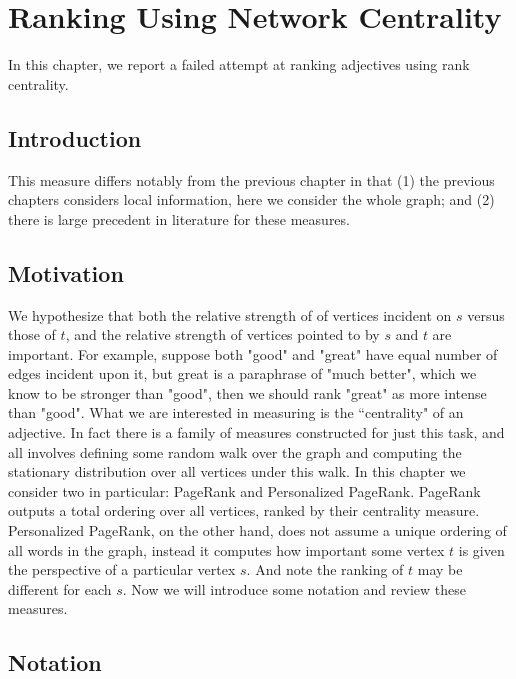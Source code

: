 \section{Ranking Using Network Centrality}

In this chapter, we report a failed attempt at ranking adjectives using rank centrality.

\subsection{Introduction}


This measure differs notably from the previous chapter in that (1) the previous chapters considers local information, here we consider the whole graph; and (2) there is large precedent in literature for these measures. 

\subsection{Motivation}

We hypothesize that both the relative strength of of vertices incident on $s$ versus those of $t$, and the relative strength of vertices pointed to by $s$ and $t$ are important. For example, suppose both "good" and "great" have equal number of edges incident upon it, but great is a paraphrase of "much better", which we know to be stronger than "good", then we should rank "great" as more intense than "good". What we are interested in measuring is the ``centrality" of an adjective. In fact there is a family of measures constructed for just this task, and all involves defining some random walk over the graph and computing the stationary distribution over all vertices under this walk. In this chapter we consider two in particular: PageRank and Personalized PageRank. PageRank outputs a total ordering over all vertices, ranked by their centrality measure. Personalized PageRank, on the other hand, does not assume a unique ordering of all words in the graph, instead it computes how important some vertex $t$ is given the perspective of a particular vertex $s$. And note the ranking of $t$ may be different for each $s$. Now we will introduce some notation and review these measures.

\subsection{Notation}

